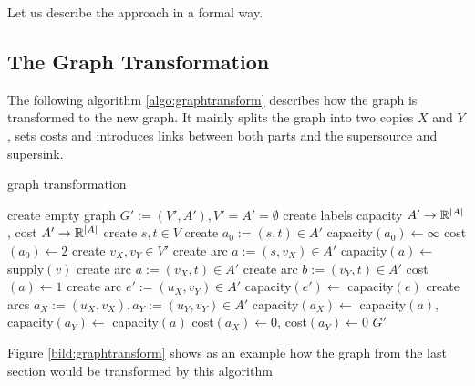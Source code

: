Let us describe the approach in a formal way.

\subsection*{The Graph Transformation}

The following algorithm \ref{algo:graphtransform} describes how the graph is transformed to the new graph. It mainly 
splits the graph into two copies $X$ and $Y$, sets costs and introduces links between both parts and the 
supersource and supersink.

\begin{algorithm}
 \caption{graph transformation}
 \label{algo:graphtransform}
 \begin{algorithmic}[5]
  \State create empty graph $G':=(V',A'), V'=A'=\emptyset$
  \State create labels capacity $A'\to \mathbb{R}^{|A|}$, cost $A'\to \mathbb{R}^{|A|}$%
  \State create $s, t\in V$ 
  \State create $a_0 :=(s,t) \in A'$
  \State capacity$(a_0)\gets\infty$ 
  \State cost$(a_0)\gets 2$ 
    \State create $v_X, v_Y\in V'$
      \State create arc $a:=(s,v_X)\in A'$
      \State capacity$(a)\gets$ supply$(v)$
      \State create arc $a:=(v_X, t)\in A'$
      \State create arc $b:=(v_Y,t)\in A'$
      \State cost$(a)\gets 1$
    \EndIf
  \EndFor
      \State create arc $e':=(u_X, v_Y)\in A'$
      \State capacity$(e')\gets$ capacity$(e)$
    \Else
      \State create arcs $a_X:=(u_X, v_X), a_Y:=(u_Y, v_Y)\in A'$
      \State capacity$(a_X)\gets$ capacity$(a)$, capacity$(a_Y)\gets$ capacity$(a)$
      \State cost$(a_X)\gets 0$, cost$(a_Y)\gets0$
    \EndIf
  \EndFor
  \State \Return $G'$
  \EndFunction
 \end{algorithmic}

\end{algorithm}

Figure \ref{bild:graphtransform} shows as an example how the graph from the last section would be transformed by this 
algorithm

